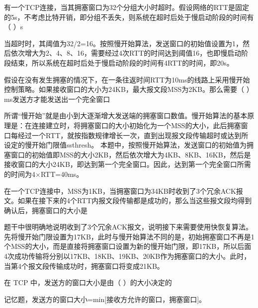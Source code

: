 \question 有一个TCP连接，当其拥塞窗口为32个分组大小时超时。假设网络的RTT是固定的5s，不考虑比特开销，即分组不丢失，则系统在超时后处于慢启动阶段的时间有（
）s
\par{}
\begin{solution}当超时时，其阈值为32/2=16。按照慢开始算法，发送窗口的初始值设置为1，然后依次增大为2、4、8、16，需要经过4次RTT的时间达到阈值16，也即慢启动阶段结束，所以系统在超时后处于慢启动阶段的时间有4RTT的时间，即20s。
\end{solution}
\question 假设在没有发生拥塞的情况下，在一条往返时间RTT为10ms的线路上采用慢开始控制策略。如果接收窗口的大小为24KB，最大报文段MSS为2KB。那么需要（
）ms发送方才能发送出一个完全窗口
\par{}
\begin{solution}所谓``慢开始''就是由小到大逐渐增大发送端的拥塞窗口数值。慢开始算法的基本原理是：在连接建立时，将拥塞窗口的大小初始化为一个MSS的大小，此后拥塞窗口每经过一个RTT，就按指数规律增长一次，直到出现报文段传输超时或达到所设定的慢开始门限值ssthresh。
本题中，按照慢开始算法，发送窗口的初始值为拥塞窗口的初始值即MSS的大小2KB，然后依次增大为4KB、8KB、16KB，然后是接收窗口的大小24KB，即达到第一个完全窗口。因此，达到第一个完全窗口所需的时间为4×RTT=40ms。
\end{solution}
\question 在一个TCP连接中，MSS为1KB，当拥塞窗口为34KB时收到了3个冗余ACK报文。如果在接下来的4个RTT内报文段传输都是成功的，那么当这些报文段均得到确认后，拥塞窗口的大小是
\par{}
\begin{solution}题干中很明确地说明收到了3个冗余ACK报文，说明接下来需要使用快恢复算法。先将慢开始门限设置为17KB，此时与慢开始算法不同的是，初始拥塞窗口不再是1个MSS的大小，而是直接将拥塞窗口设置为新的慢开始门限，即17KB，所以后面4次成功传输将分别以17KB、18KB、19KB、20KB作为拥塞窗口的大小。此时，当第4个报文段传输成功时，拥塞窗口将变成21KB。
\end{solution}
\question 在 TCP 中，发送方的窗口大小是由（ ）的大小决定的
\par{}
\begin{solution}记忆题，发送方的窗口大小=min{[}接收方允许的窗口，拥塞窗口{]}。
\end{solution}
